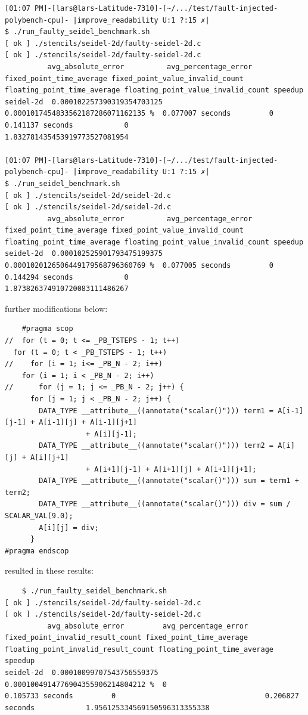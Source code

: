 \begin{verbatim}
[01:07 PM]-[lars@lars-Latitude-7310]-[~/.../test/fault-injected-polybench-cpu]- |improve_readability U:1 ?:15 ✗|
$ ./run_faulty_seidel_benchmark.sh 
[ ok ] ./stencils/seidel-2d/faulty-seidel-2d.c
[ ok ] ./stencils/seidel-2d/faulty-seidel-2d.c
          avg_absolute_error          avg_percentage_error                 fixed_point_time_average fixed_point_value_invalid_count floating_point_time_average floating_point_value_invalid_count speedup                       
seidel-2d  0.000102257390319354703125  0.0001017454833562187286071162135 %  0.077007 seconds         0                               0.141137 seconds            0                                  1.832781435453919773527081954

[01:07 PM]-[lars@lars-Latitude-7310]-[~/.../test/fault-injected-polybench-cpu]- |improve_readability U:1 ?:15 ✗|
$ ./run_seidel_benchmark.sh 
[ ok ] ./stencils/seidel-2d/seidel-2d.c
[ ok ] ./stencils/seidel-2d/seidel-2d.c
          avg_absolute_error          avg_percentage_error                 fixed_point_time_average fixed_point_value_invalid_count floating_point_time_average floating_point_value_invalid_count speedup                       
seidel-2d  0.000102525901793475199375  0.0001020126506449179568796360769 %  0.077005 seconds         0                               0.144294 seconds            0                                  1.873826374910720083111486267
\end{verbatim}


further modifications below:
\begin{verbatim}
    #pragma scop
//  for (t = 0; t <= _PB_TSTEPS - 1; t++)
  for (t = 0; t < _PB_TSTEPS - 1; t++)
//    for (i = 1; i<= _PB_N - 2; i++)
    for (i = 1; i < _PB_N - 2; i++)
//      for (j = 1; j <= _PB_N - 2; j++) {
      for (j = 1; j < _PB_N - 2; j++) {
        DATA_TYPE __attribute__((annotate("scalar()"))) term1 = A[i-1][j-1] + A[i-1][j] + A[i-1][j+1]
                   + A[i][j-1];
        DATA_TYPE __attribute__((annotate("scalar()"))) term2 = A[i][j] + A[i][j+1]
                   + A[i+1][j-1] + A[i+1][j] + A[i+1][j+1];
        DATA_TYPE __attribute__((annotate("scalar()"))) sum = term1 + term2;
        DATA_TYPE __attribute__((annotate("scalar()"))) div = sum / SCALAR_VAL(9.0);
        A[i][j] = div;
      }
#pragma endscop
\end{verbatim}

resulted in these results:
\begin{verbatim}
    $ ./run_faulty_seidel_benchmark.sh 
[ ok ] ./stencils/seidel-2d/faulty-seidel-2d.c
[ ok ] ./stencils/seidel-2d/faulty-seidel-2d.c
          avg_absolute_error         avg_percentage_error                 fixed_point_invalid_result_count fixed_point_time_average floating_point_invalid_result_count floating_point_time_average speedup                       
seidel-2d  0.00010099707543756559375  0.0001004914776904355906214804212 %  0                                0.105733 seconds         0                                   0.206827 seconds            1.956125334569150596313355338


\end{verbatim}


